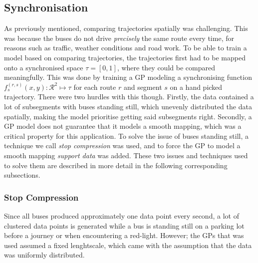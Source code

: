 \subsection{Synchronisation}
As previously mentioned, comparing trajectories spatially was challenging. This was because the buses do not drive \textit{precisely} the same route every time, for reasons such as traffic, weather conditions and road work. To be able to train a model based on comparing trajectories, the trajectories first had to be mapped onto a synchronised space $\tau = [0, 1]$, where they could be compared meaningfully. This was done by training a GP modeling a synchronising function $f^{(r,s)}_s(x, y) : \mathcal{R}^2 \mapsto \tau$ for each route $r$ and segment $s$ on a hand picked trajectory. There were two hurdles with this though. Firstly, the data contained a lot of subsegments with buses standing still, which unevenly distributed the data spatially, making the model prioritise getting said subsegments right. Secondly, a GP model does not guarantee that it models a smooth mapping, which was a critical property for this application. To solve the issue of buses standing still, a technique we call \textit{stop compression} was used, and to force the GP to model a smooth mapping \textit{support data} was added. These two issues and techniques used to solve them are described in more detail in the following corresponding subsections.

\subsubsection{Stop Compression}
Since all buses produced approximately one data point every second, a lot of clustered data points is generated while a bus is standing still on a parking lot before a journey or when encountering a red-light. However; the GPs that was used assumed a fixed lenghtscale, which came with the assumption that the data was uniformly distributed.

